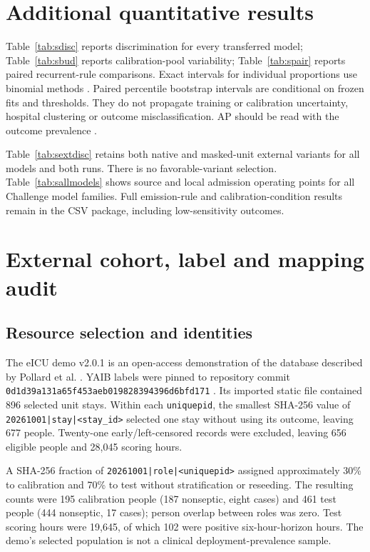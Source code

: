 \documentclass[11pt,a4paper]{article}
\begin{document}
\section{Additional quantitative results}
Table~\ref{tab:sdisc} reports discrimination for every transferred model; Table~\ref{tab:sbud} reports calibration-pool variability; Table~\ref{tab:spair} reports paired recurrent-rule comparisons. Exact intervals for individual proportions use binomial methods \cite{clopper}. Paired percentile bootstrap intervals \cite{efron} are conditional on frozen fits and thresholds. They do not propagate training or calibration uncertainty, hospital clustering or outcome misclassification. AP should be read with the outcome prevalence \cite{saito}.




\FloatBarrier

Table~\ref{tab:sextdisc} retains both native and masked-unit external variants for all models and both runs. There is no favorable-variant selection. Table~\ref{tab:sallmodels} shows source and local admission operating points for all Challenge model families. Full emission-rule and calibration-condition results remain in the CSV package, including low-sensitivity outcomes.



\FloatBarrier

\section{External cohort, label and mapping audit}
\subsection{Resource selection and identities}
The eICU demo v2.0.1 is an open-access demonstration of the database described by Pollard et al. \cite{eicudemo,eicu}. YAIB labels were pinned to repository commit \texttt{0d1d39a131a65f453aeb019828394396d6bfd171} \cite{yaib}. Its imported static file contained 896 selected unit stays. Within each \texttt{uniquepid}, the smallest SHA-256 value of \texttt{20261001|stay|<stay\_id>} selected one stay without using its outcome, leaving 677 people. Twenty-one early/left-censored records were excluded, leaving 656 eligible people and 28,045 scoring hours.

A SHA-256 fraction of \texttt{20261001|role|<uniquepid>} assigned approximately 30\% to calibration and 70\% to test without stratification or reseeding. The resulting counts were 195 calibration people (187 nonseptic, eight cases) and 461 test people (444 nonseptic, 17 cases); person overlap between roles was zero. Test scoring hours were 19,645, of which 102 were positive six-hour-horizon hours. The demo's selected population is not a clinical deployment-prevalence sample.
\end{document}
